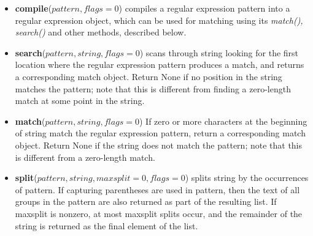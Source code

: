 \begin{itemize}
\item \textbf{compile}($pattern, flags=0$) compiles a regular expression pattern into a regular expression object, which can be used for matching using its \textit{match(), search()} and other methods, described below.
\item \textbf{search}($pattern, string, flags=0$) scans through string looking for the first location where the regular expression pattern produces a match, and returns a corresponding match object. Return None if no position in the string matches the pattern; note that this is different from finding a zero-length match at some point in the string.
\item \textbf{match}($pattern, string, flags=0$) If zero or more characters at the beginning of string match the regular expression pattern, return a corresponding match object. Return None if the string does not match the pattern; note that this is different from a zero-length match.
\item \textbf{split}($pattern, string, maxsplit=0, flags=0$) splits string by the occurrences of pattern. If capturing parentheses are used in pattern, then the text of all groups in the pattern are also returned as part of the resulting list. If maxsplit is nonzero, at most maxsplit splits occur, and the remainder of the string is returned as the final element of the list.
\end{itemize}